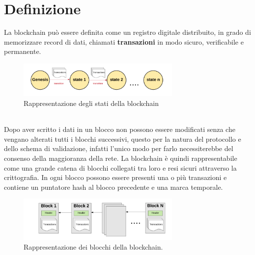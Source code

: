 \documentclass[a4paper,11pt]{report}
\begin{document}
\section{Definizione}
La blockchain può essere definita come un registro digitale distribuito, in grado di memorizzare record di dati, chiamati \textbf{transazioni} in modo sicuro, verificabile e permanente. \\
\begin{figure}[htbp] 
\begin{center}
\includegraphics[width=8cm]{img/genesis.png} 
\end{center}
\caption{Rappresentazione degli stati della blockchain \cite{genesis}}
\end{figure}
\\Dopo aver scritto i dati in un blocco non possono essere modificati senza che vengano alterati tutti i blocchi successivi, questo per la natura del protocollo e dello schema di validazione, infatti l'unico modo per farlo necessiterebbe del consenso della maggioranza della rete. La blockchain è quindi rappresentabile come una grande catena di blocchi collegati tra loro e resi sicuri attraverso la crittografia. In ogni blocco possono essere presenti una o più transazioni e contiene un puntatore hash al blocco precedente e una marca temporale. \\

\begin{figure}[htbp] 
\begin{center}
\includegraphics[width=8cm]{img/blkc.png} 
\end{center}
\caption{Rappresentazione dei blocchi della blockchain. \cite{genesis}}
\end{figure}
\end{document}
